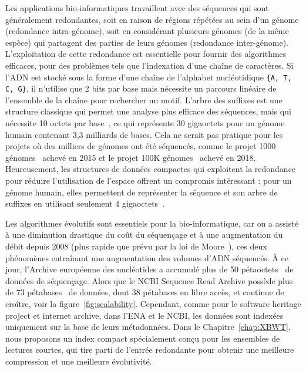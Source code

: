 Les applications bio-informatiques travaillent avec des séquences qui sont généralement redondantes, soit en raison de régions répétées au sein d'un génome (redondance intra-génome), soit en considérant plusieurs génomes (de la même espèce) qui partagent des parties de leurs génomes (redondance inter-génome).
L'exploitation de cette redondance est essentielle pour fournir des algorithmes efficaces, pour des problèmes tels que l'indexation d'une chaîne de caractères.
Si l'ADN est stocké sous la forme d'une chaîne de l'alphabet nucléotidique \texttt{\{A, T, C, G\}}, il n'utilise que 2 bits par base mais nécessite un parcours linéaire de l'ensemble de la chaîne pour rechercher un motif. 
L'arbre des suffixes est une structure classique qui permet une analyse plus efficace des séquences, mais qui nécessite 10 octets par base~\cite{navarro2016compact}, ce qui représente 30 gigaoctets pour un génome humain contenant 3,3 milliards de bases. 
Cela ne serait pas pratique pour les projets où des milliers de génomes ont été séquencés, comme le projet 1000 génomes~\cite{10002015global} achevé en 2015 et le projet 100K génomes~\cite{100Kgenomes} achevé en 2018. 
Heureusement, les structures de données compactes qui exploitent la redondance pour réduire l'utilisation de l'espace offrent un compromis intéressant : pour un génome humain, elles permettent de représenter la séquence et son arbre de suffixes en utilisant seulement 4 gigaoctets~\cite{navarro2016compact}.

Les algorithmes évolutifs sont essentiels pour la bio-informatique, car on a assisté à une diminution drastique du coût du séquençage et à une augmentation du débit depuis 2008 (plus rapide que prévu par la loi de Moore~\cite{muir2016real}), ces deux phénomènes entraînant une augmentation des volumes d'ADN séquencés. 
À ce jour, l'Archive européenne des nucléotides a accumulé plus de 50 pétaoctets~\cite{ena} de données de séquençage.
Alors que le NCBI Sequence Read Archive possède plus de 73 pétabases~\cite{sra} de données, dont 38 pétabases en libre accès, et continue de croître, voir la figure~\ref{fig:scalability}. Cependant, comme pour le software heritage project et internet archive, dans l'ENA et le NCBI, les données sont indexées uniquement sur la base de leurs métadonnées.
Dans le Chapitre~\ref{chap:XBWT}, nous proposons un index compact spécialement conçu pour les ensembles de lectures courtes, qui tire parti de l'entrée redondante pour obtenir une meilleure compression et une meilleure évolutivité.

